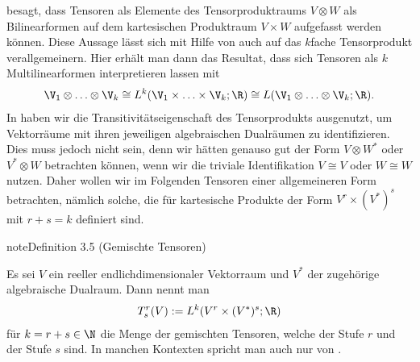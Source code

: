 \documentclass[letterpaper,10pt,german]{jupyterBook}
\begin{document}
\sphinxAtStartPar
{\hyperref[\detokenize{vektoranalysis/tensor:cor:tensorMultilinearform}]{}} besagt, dass Tensoren als Elemente des Tensorproduktraums \(V \otimes W\) als Bilinearformen auf dem kartesischen Produktraum \(V \times W\) aufgefasst werden können.
Diese Aussage lässt sich mit Hilfe von {\hyperref[\detokenize{vektoranalysis/tensor:rem:kfachesTensorprodukt}]{}} auch auf das \(k\)\sphinxhyphen{}fache Tensorprodukt verallgemeinern.
Hier erhält man dann das Resultat, dass sich Tensoren als \(k\)\sphinxhyphen{}Multilinearformen interpretieren lassen mit
\begin{equation*}
\begin{split}\V_1\otimes\ldots\otimes\V_k \cong L^k(\V_1\times\ldots\times\V_k;\R) \cong L(\V_1\otimes\ldots \otimes\V_k;\R).\end{split}
\end{equation*}
\sphinxAtStartPar
In {\hyperref[\detokenize{vektoranalysis/tensor:equation-eq-transitivisomorphismus}]{}} haben wir die Transitivitätseigenschaft des Tensorprodukts ausgenutzt, um  Vektorräume mit ihren jeweiligen algebraischen Dualräumen zu identifizieren.
Dies muss jedoch nicht sein, denn wir hätten genauso gut  der Form \(V \otimes W^\ast\) oder \(V^\ast \otimes W\) betrachten können, wenn wir die triviale Identifikation \(V \cong V\) oder \(W \cong W\) nutzen.
Daher wollen wir im Folgenden Tensoren einer allgemeineren Form betrachten, nämlich solche, die für kartesische Produkte der Form \(V^r\times (V^\ast)^s\) mit \(r+s=k\) definiert sind.
\label{vektoranalysis/tensor:def:gemischteTensoren}
\begin{sphinxadmonition}{note}{Definition 3.5 (Gemischte Tensoren)}



\sphinxAtStartPar
Es sei \(V\) ein reeller endlich\sphinxhyphen{}dimensionaler Vektorraum und \(V^\ast\) der zugehörige algebraische Dualraum.
Dann nennt man
\begin{equation*}
\begin{split}T^r_s(V) := L^k(V^r\times (V^\ast)^s; \R)\end{split}
\end{equation*}
\sphinxAtStartPar
für \(k = r+s \in \N\) die Menge der gemischten Tensoren, welche  der Stufe \(r\) und  der Stufe \(s\) sind.
In manchen Kontexten spricht man auch nur von .
\end{sphinxadmonition}
\end{document}
